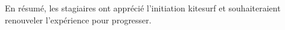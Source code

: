 \documentclass[11pt,a4paper]{report}
\begin{document}
En résumé, les stagiaires ont apprécié l'initiation kitesurf et
souhaiteraient renouveler l'expérience pour progresser.
\end{document}
